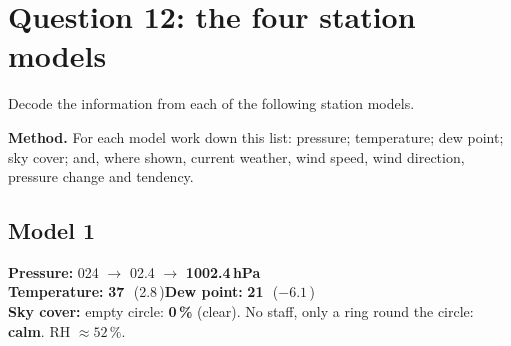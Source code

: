 \section{Question 12: the four station models}\label{p3-sec:sheetmodels}

\begin{questionbox}
Decode the information from each of the following station models.
\end{questionbox}

\textbf{Method.} For each model work down this list: pressure; temperature; dew point; sky cover; and, where shown, current weather, wind speed, wind direction, pressure change and tendency.

\subsection*{Model 1}
\begin{center}
\end{center}
\begin{answerbox}[Model 1]\small
\textbf{Pressure:} 024 $\to$ 02.4 $\to$ \textbf{1002.4\,hPa}\\
\textbf{Temperature:} \textbf{37\,\degF}\ (2.8\,\degC)\qquad \textbf{Dew point:} \textbf{21\,\degF}\ ($-6.1$\,\degC)\\
\textbf{Sky cover:} empty circle: \textbf{0\,\%} (clear). No staff, only a ring round the circle: \textbf{calm}. RH $\approx52\,\%$.
\end{answerbox}
